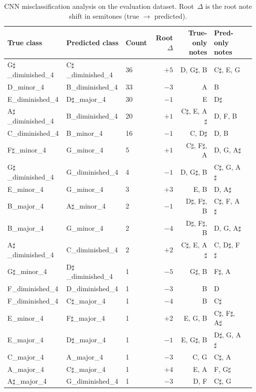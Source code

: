 \documentclass[pdflatex,sn-mathphys-num]{sn-jnl}
\begin{document}
\begin{table}[h]
\caption{CNN misclassification analysis on the evaluation dataset.
Root~$\Delta$ is the root note shift in semitones (true $\to$ predicted).}
\label{tab4_4}
{\small
\begin{tabular*}{\textwidth}{@{}lllrrll@{}}
\toprule
True class & Predicted class & Count & Root $\Delta$ & True-only notes & Pred-only notes \\
\midrule
G$\sharp$\_diminished\_4 & C$\sharp$\_diminished\_4 & 36 & $+5$ & D, G$\sharp$, B & C$\sharp$, E, G \\
D\_minor\_4              & B\_diminished\_4         & 33 & $-3$ & A               & B \\
E\_diminished\_4         & D$\sharp$\_major\_4      & 30 & $-1$ & E               & D$\sharp$ \\
A$\sharp$\_diminished\_4 & B\_diminished\_4         & 20 & $+1$ & C$\sharp$, E, A$\sharp$ & D, F, B \\
C\_diminished\_4         & B\_minor\_4              & 16 & $-1$ & C, D$\sharp$    & D, B \\
F$\sharp$\_minor\_4      & G\_minor\_4              &  5 & $+1$ & C$\sharp$, F$\sharp$, A & D, G, A$\sharp$ \\
G$\sharp$\_diminished\_4 & G\_diminished\_4         &  4 & $-1$ & D, G$\sharp$, B & C$\sharp$, G, A$\sharp$ \\
E\_minor\_4              & G\_minor\_4              &  3 & $+3$ & E, B            & D, A$\sharp$ \\
B\_major\_4              & A$\sharp$\_minor\_4      &  2 & $-1$ & D$\sharp$, F$\sharp$, B & C$\sharp$, F, A$\sharp$ \\
B\_major\_4              & G\_minor\_4              &  2 & $-4$ & D$\sharp$, F$\sharp$, B & D, G, A$\sharp$ \\
A$\sharp$\_diminished\_4 & C\_diminished\_4         &  2 & $+2$ & C$\sharp$, E, A$\sharp$ & C, D$\sharp$, F$\sharp$ \\
G$\sharp$\_minor\_4      & D$\sharp$\_diminished\_4 &  1 & $-5$ & G$\sharp$, B    & F$\sharp$, A \\
F\_diminished\_4         & D\_diminished\_4         &  1 & $-3$ & B               & D \\
F\_diminished\_4         & C$\sharp$\_major\_4      &  1 & $-4$ & B               & C$\sharp$ \\
E\_minor\_4              & F$\sharp$\_major\_4      &  1 & $+2$ & E, G, B         & C$\sharp$, F$\sharp$, A$\sharp$ \\
E\_major\_4              & D$\sharp$\_major\_4      &  1 & $-1$ & E, G$\sharp$, B & D$\sharp$, G, A$\sharp$ \\
C\_major\_4              & A\_major\_4              &  1 & $-3$ & C, G            & C$\sharp$, A \\
A\_major\_4              & C$\sharp$\_major\_4      &  1 & $+4$ & E, A            & F, G$\sharp$ \\
A$\sharp$\_major\_4      & G\_diminished\_4         &  1 & $-3$ & D, F            & C$\sharp$, G \\
\bottomrule
\end{tabular*}
}
\end{table}
\end{document}
